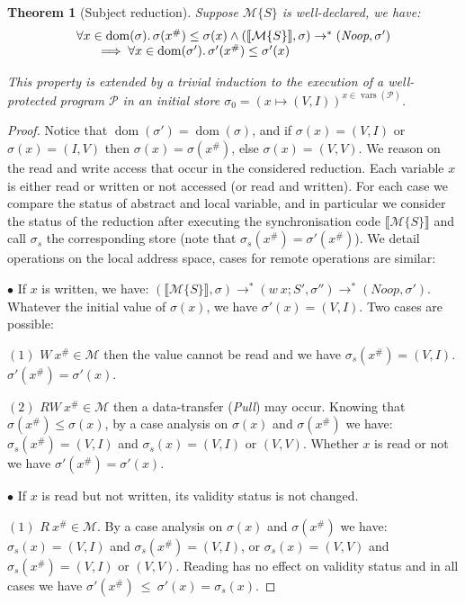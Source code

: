 \documentclass[preprint,12pt]{elsarticle}
\newcommand{\symb}[1]{\textit{#1}}
\newcommand{\noop}{\symb{Noop}}
\newcommand{\Pull}{\symb{Pull}}
\DeclareMathOperator{\vars}{vars}
\newcommand{\transl}[1]{\llbracket#1\rrbracket}
\newtheorem{Theorem}{Theorem}
\newcommand{\abs}[1]{#1^\#}
\newcommand{\AM}{\mathcal{M}}
\newcommand{\Prog}{\mathcal{P}}
\DeclareMathOperator{\dom}{dom}
\begin{document}
\begin{Theorem}[Subject reduction]\label{thm-SR}
Suppose $\AM\{S\}$ is well-declared, we have:
\[\begin{array}{@{}l@{}}
\forall x\in \dom(\sigma).\, \sigma(\abs x)\leq\sigma(x) 
\land
 (\transl{\AM\{S\}},\sigma) \to^* (\noop,\sigma')
\\~~~~~
\implies \forall x\in \dom(\sigma').\, \sigma'(\abs x)\leq\sigma'(x) 
\end{array}\]

This property is extended by a trivial induction to the execution of a well-protected 
program $\Prog$ in an initial store $\sigma_0=(x\mapsto 
(V,I))^{x\in \vars(\Prog)}$.
\end{Theorem}
\begin{proof}
Notice that $\dom(\sigma')=\dom(\sigma)$, and  if $\sigma(x)=(V,I)$ or $\sigma(x)=(I,V)$ 
then $\sigma(x)=\sigma(\abs x)$, else $\sigma(x)=(V,V)$.
We reason on the read and write access that occur in the considered reduction. Each 
variable $x$ is either read or written or not accessed (or read and written). For each 
case we compare the 
status of abstract and local variable, and in particular we consider the status of the 
reduction after executing the synchronisation code $\transl{\AM\{S\}}$ and call 
$\sigma_s$ the corresponding store (note that $\sigma_s(\abs x)=\sigma'(\abs x)$). We 
detail operations on the local 
address space, cases for remote operations are similar:

\noindent$\bullet$ If  $x$ is written, we have:
$(\transl{\AM\{S\}},\sigma)\to^* (w~x;S',\sigma'')  \to^* (\noop,\sigma')$. Whatever the 
initial value of $\sigma(x)$, we have $\sigma'(x)=(V,I)$. Two cases are possible:

\noindent$(1)$ $W~\abs x \in \AM$ then the value cannot be read and we have 
$\sigma_s(\abs x)=(V,I)$.  $ \sigma'(\abs x)=\sigma'(x)$.

\noindent$(2)$ $RW~\abs x \in \AM$ then a data-transfer (\Pull) may occur. Knowing that 
$\sigma(\abs x)\leq\sigma(x)$, by a  
case 
analysis on $\sigma(x)$ and $\sigma(\abs x)$ we have: $\sigma_s(\abs x)=(V,I)$ and 
$\sigma_s(x)=(V,I)$ or $(V,V)$. Whether $x$ is  read or not we have $ \sigma'(\abs 
x)=\sigma'(x)$.

\noindent$\bullet$ If  $x$ is read but not written, its validity status is 
not changed. %

\noindent$(1)$ $R~\abs x \in \AM$. By 
a  case 
analysis on $\sigma(x)$ and $\sigma(\abs x)$ we have:
$\sigma_s(x)\!=\!(V,I)$ and  $\sigma_s(\abs x)\!=\!(V,I)$, or $\sigma_s(x)\!=\!(V,V)$ 
and  
$\sigma_s(\abs x)\!=\!(V,I)$ or $(V,V)$.  Reading has no effect on validity status and in 
all 
cases we have $\sigma'(\abs x)~\leq~\sigma'(x)=\sigma_s(x)$.


\end{proof}
\end{document}
